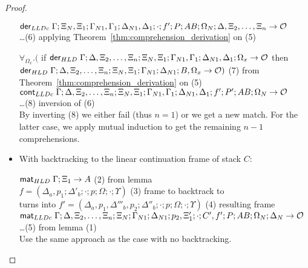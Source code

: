 \begin{proof}
\begin{itemize}[leftmargin=*]
      $\mathsf{der}_{LLDc} \; \Gamma; \Xi_N, \Xi_1; \Gamma_{N1}, \Gamma_1; \Delta_{N1}, \Delta_1;
            \cdot; f'; P; AB; \Omega_N; \Delta, \Xi_2, \dotsc, \Xi_n \rightarrow \mathcal{O}$
      \\ \dots \hfill (6) applying Theorem~\ref{thm:comprehension_derivation} on (5)

      $\forall_{\Omega_x}. ($ if $\mathsf{der}_{HLD} \; \Gamma; \Delta, \Xi_2, \dotsc, \Xi_n; \Xi_N, \Xi_1;
            \Gamma_{N1}, \Gamma_1; \Delta_{N1}, \Delta_1; \Omega_x \rightarrow
            \mathcal{O}$ then \\ \hspace*{0.5cm} $\mathsf{der}_{HLD} \; \Gamma;
            \Delta, \Xi_2, \dotsc, \Xi_n; \Xi_N, \Xi_1; \Gamma_{N1}; \Delta_{N1}; B, \Omega_x
            \rightarrow \mathcal{O})$ \hfill (7) from
      Theorem~\ref{thm:comprehension_derivation} on (5) \\

      $\mathsf{cont}_{LLDc} \; \Gamma; \Delta, \Xi_2, \dotsc, \Xi_n; \Xi_N, \Xi_1; \Gamma_{N1},
         \Gamma_1; \Delta_{N1}, \Delta_1; f'; P'; AB; \Omega_N
         \rightarrow \mathcal{O}$\\ \dots \hfill (8) inversion of (6) \\
        
        By inverting (8) we either fail (thus $n = 1$) or we get a new match.
        For the latter case, we apply mutual induction to get the remaining $n -
        1$ comprehensions.
      
   \item With backtracking to the linear continuation frame of stack $C$:
      
      $\mathsf{mat}_{HLD} \; \Gamma; \Xi_1 \rightarrow A$ \hfill (2) from lemma \\

      $f = (\Delta_a, p_1; \Delta'_b; \cdot; p; \Omega; \cdot; \Upsilon)$ \hfill (3) frame to backtrack to \\
      turns into $f' = (\Delta_a, p_1, \Delta'''_b, p_2; \Delta''_b; \cdot; p; \Omega; \cdot; \Upsilon)$ \hfill (4) resulting frame \\

      $\mathsf{mat}_{LLDc} \; \Gamma; \Delta, \Xi_2, \dotsc, \Xi_n; \Xi_N; \Gamma_{N1};
\Delta_{N1}; p_2, \Xi'_1; \cdot; C', f'; P; AB; \Omega_N; \Delta_N \rightarrow
\mathcal{O}$\\ \dots \hfill (5) from lemma (1) \\
      
      Use the same approach as the case with no backtracking.
      

\end{itemize}
\end{proof}
